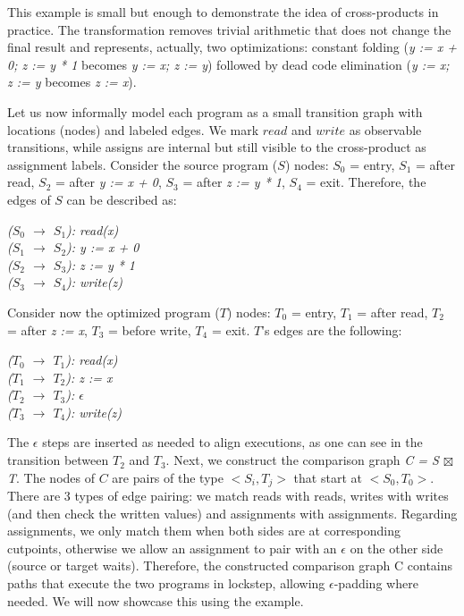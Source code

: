 This example is small but enough to demonstrate the idea of cross-products in practice.
The transformation removes trivial arithmetic that does not change the final result and represents, actually, two optimizations: constant folding (\emph{y := x + 0; z := y * 1} becomes \emph{y := x; z := y}) followed by dead code elimination (\emph{y := x; z := y} becomes \emph{z := x}).

Let us now informally model each program as a small transition graph with locations (nodes) and labeled edges.
We mark $read$ and $write$ as observable transitions, while assigns are internal but still visible to the cross-product as assignment labels.
Consider the source program ($S$) nodes: $S_0$ = entry, $S_1$ = after read, $S_2$ = after \emph{y := x + 0}, $S_3$ = after \emph{z := y * 1}, $S_4$ = exit.
Therefore, the edges of $S$ can be described as:
\begin{tabbing}
  \emph{($S_0$ $\rightarrow$ $S_1$): read(x)} \\
  \emph{($S_1$ $\rightarrow$ $S_2$): y := x + 0} \\
  \emph{($S_2$ $\rightarrow$ $S_3$): z := y * 1} \\
  \emph{($S_3$ $\rightarrow$ $S_4$): write(z)}
  \label{tabbing:cross_products_transitions_s}
\end{tabbing}

Consider now the optimized program ($T$) nodes: $T_0$ = entry, $T_1$ = after read, $T_2$ = after \emph{z := x}, $T_3$ = before write, $T_4$ = exit.
$T$'s edges are the following:
\begin{tabbing}
  \emph{($T_0$ $\rightarrow$ $T_1$): read(x)} \\
  \emph{($T_1$ $\rightarrow$ $T_2$): z := x} \\
  \emph{($T_2$ $\rightarrow$ $T_3$): $\epsilon$} \\
  \emph{($T_3$ $\rightarrow$ $T_4$): write(z)}
  \label{tabbing:cross_products_example_transitions_t}
\end{tabbing}

The $\epsilon$ steps are inserted as needed to align executions, as one can see in the transition between $T_2$ and $T_3$.
Next, we construct the comparison graph \emph{C = S $\boxtimes$ T}.
The nodes of $C$ are pairs of the type $<S_i, T_j>$ that start at $<S_0, T_0>$.
There are 3 types of edge pairing: we match reads with reads, writes with writes (and then check the written values) and assignments with assignments.
Regarding assignments, we only match them when both sides are at corresponding cutpoints, otherwise we allow an assignment to pair with an $\epsilon$ on the other side (source or target waits).
Therefore, the constructed comparison graph C contains paths that execute the two programs in lockstep, allowing $\epsilon$-padding where needed.
We will now showcase this using the example.

